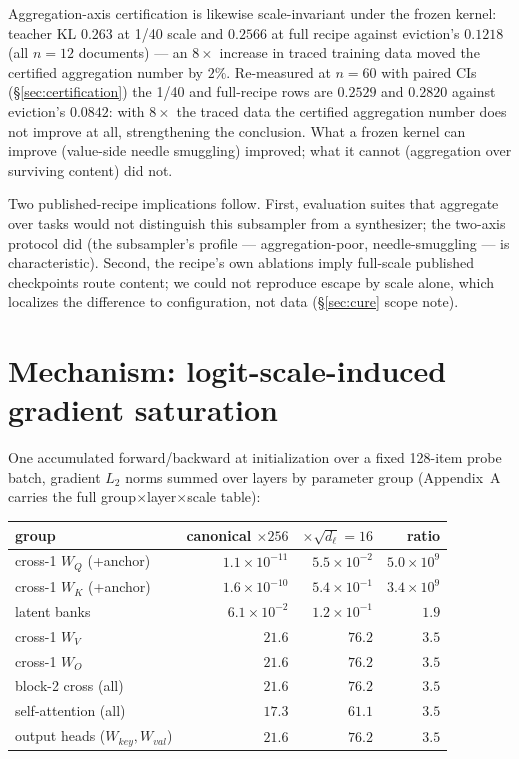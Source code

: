 \documentclass[11pt]{article}
\newcommand{\dl}{d_{\ell}}
\begin{document}
Aggregation-axis certification is likewise scale-invariant under the
frozen kernel: teacher KL $0.263$ at 1/40 scale and $0.2566$ at full
recipe against eviction's $0.1218$ (all $n{=}12$ documents) --- an
$8\times$ increase in traced training data moved the certified
aggregation number by $2\%$. Re-measured at $n{=}60$ with paired CIs
(\S\ref{sec:certification}) the 1/40 and full-recipe rows are $0.2529$
and $0.2820$ against eviction's $0.0842$: with $8\times$ the traced data
the certified aggregation number does not improve at all, strengthening
the conclusion. What a
frozen kernel can improve (value-side needle smuggling) improved; what
it cannot (aggregation over surviving content) did not.

Two published-recipe implications follow. First, evaluation suites that
aggregate over tasks would not distinguish this subsampler from a
synthesizer; the two-axis protocol did (the subsampler's profile ---
aggregation-poor, needle-smuggling --- is characteristic). Second, the
recipe's own ablations imply full-scale published checkpoints route
content; we could not reproduce escape by scale alone, which localizes
the difference to configuration, not data (\S\ref{sec:cure} scope note).

\section{Mechanism: logit-scale-induced gradient saturation}
\label{sec:mechanism}

One accumulated forward/backward at initialization over a fixed 128-item
probe batch, gradient $L_2$ norms summed over layers by parameter group
(Appendix~A carries the full group$\times$layer$\times$scale table):

\begin{center}
\begin{tabular}{lrrr}
\toprule
group & canonical $\times 256$ & $\times\sqrt{\dl}=16$ & ratio \\
\midrule
cross-1 $W_Q$ (+anchor) & $1.1\times10^{-11}$ & $5.5\times10^{-2}$ & $5.0\times10^{9}$ \\
cross-1 $W_K$ (+anchor) & $1.6\times10^{-10}$ & $5.4\times10^{-1}$ & $3.4\times10^{9}$ \\
latent banks            & $6.1\times10^{-2}$  & $1.2\times10^{-1}$ & $1.9$ \\
cross-1 $W_V$           & $21.6$              & $76.2$             & $3.5$ \\
cross-1 $W_O$           & $21.6$              & $76.2$             & $3.5$ \\
block-2 cross (all)     & $21.6$              & $76.2$             & $3.5$ \\
self-attention (all)    & $17.3$              & $61.1$             & $3.5$ \\
output heads ($W_{key}, W_{val}$) & $21.6$    & $76.2$             & $3.5$ \\
\bottomrule
\end{tabular}
\end{center}
\end{document}
